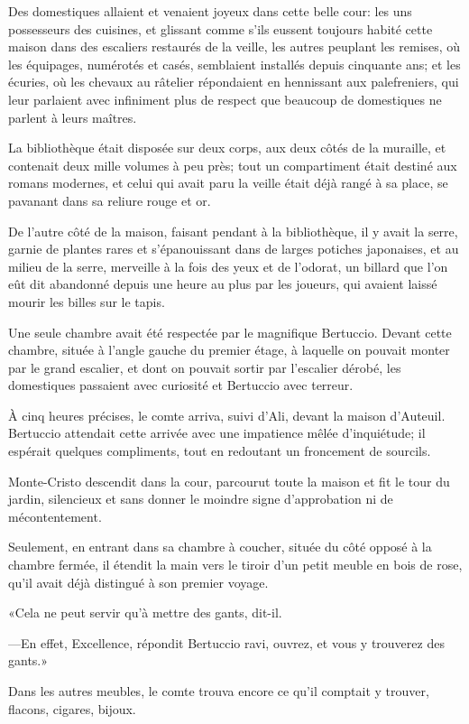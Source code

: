 Des domestiques allaient et venaient joyeux dans cette belle cour: les uns possesseurs des cuisines, et glissant comme s'ils eussent toujours habité cette maison dans des escaliers restaurés de la veille, les autres peuplant les remises, où les équipages, numérotés et casés, semblaient installés depuis cinquante ans; et les écuries, où les chevaux au râtelier répondaient en hennissant aux palefreniers, qui leur parlaient avec infiniment plus de respect que beaucoup de domestiques ne parlent à leurs maîtres. 

La bibliothèque était disposée sur deux corps, aux deux côtés de la muraille, et contenait deux mille volumes à peu près; tout un compartiment était destiné aux romans modernes, et celui qui avait paru la veille était déjà rangé à sa place, se pavanant dans sa reliure rouge et or.  

De l'autre côté de la maison, faisant pendant à la bibliothèque, il y avait la serre, garnie de plantes rares et s'épanouissant dans de larges potiches japonaises, et au milieu de la serre, merveille à la fois des yeux et de l'odorat, un billard que l'on eût dit abandonné depuis une heure au plus par les joueurs, qui avaient laissé mourir les billes sur le tapis. 

Une seule chambre avait été respectée par le magnifique Bertuccio. Devant cette chambre, située à l'angle gauche du premier étage, à laquelle on pouvait monter par le grand escalier, et dont on pouvait sortir par l'escalier dérobé, les domestiques passaient avec curiosité et Bertuccio avec terreur. 

À cinq heures précises, le comte arriva, suivi d'Ali, devant la maison d'Auteuil. Bertuccio attendait cette arrivée avec une impatience mêlée d'inquiétude; il espérait quelques compliments, tout en redoutant un froncement de sourcils. 

Monte-Cristo descendit dans la cour, parcourut toute la maison et fit le tour du jardin, silencieux et sans donner le moindre signe d'approbation ni de mécontentement. 

Seulement, en entrant dans sa chambre à coucher, située du côté opposé à la chambre fermée, il étendit la main vers le tiroir d'un petit meuble en bois de rose, qu'il avait déjà distingué à son premier voyage. 

«Cela ne peut servir qu'à mettre des gants, dit-il. 

—En effet, Excellence, répondit Bertuccio ravi, ouvrez, et vous y trouverez des gants.»  

Dans les autres meubles, le comte trouva encore ce qu'il comptait y trouver, flacons, cigares, bijoux. 

